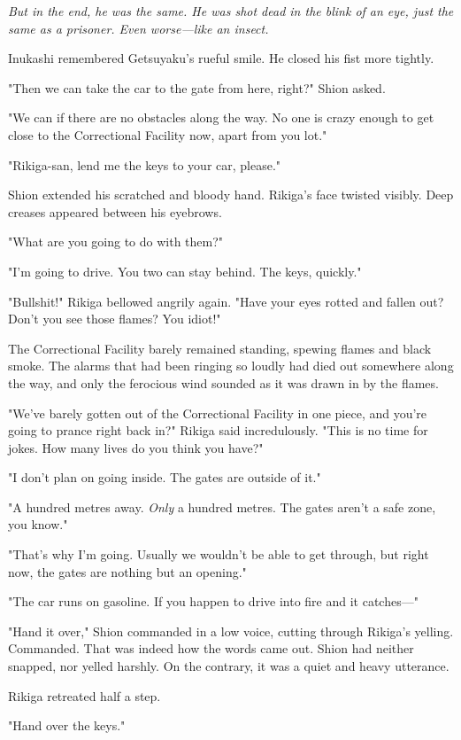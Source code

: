 \emph{But in the end, he was the same. He was shot dead in the blink of an
eye, just the same as a prisoner. Even worse---like an insect.}

Inukashi remembered Getsuyaku's rueful smile. He closed his fist more
tightly.

"Then we can take the car to the gate from here, right?" Shion asked.

"We can if there are no obstacles along the way. No one is crazy enough
to get close to the Correctional Facility now, apart from you lot."

"Rikiga-san, lend me the keys to your car, please."

Shion extended his scratched and bloody hand. Rikiga's face twisted
visibly. Deep creases appeared between his eyebrows.

"What are you going to do with them?"

"I'm going to drive. You two can stay behind. The keys, quickly."

"Bullshit!" Rikiga bellowed angrily again. "Have your eyes rotted and
fallen out? Don't you see those flames? You idiot!"

The Correctional Facility barely remained standing, spewing flames and
black smoke. The alarms that had been ringing so loudly had died out
somewhere along the way, and only the ferocious wind sounded as it was
drawn in by the flames.

"We've barely gotten out of the Correctional Facility in one piece, and
you're going to prance right back in?" Rikiga said incredulously. "This
is no time for jokes. How many lives do you think you have?"

"I don't plan on going inside. The gates are outside of it."

"A hundred metres away. \emph{Only} a hundred metres. The gates aren't a safe
zone, you know."

"That's why I'm going. Usually we wouldn't be able to get through, but
right now, the gates are nothing but an opening."

"The car runs on gasoline. If you happen to drive into fire and it
catches---"

"Hand it over," Shion commanded in a low voice, cutting through Rikiga's
yelling. Commanded. That was indeed how the words came out. Shion had
neither snapped, nor yelled harshly. On the contrary, it was a quiet and
heavy utterance.

Rikiga retreated half a step.

"Hand over the keys."

